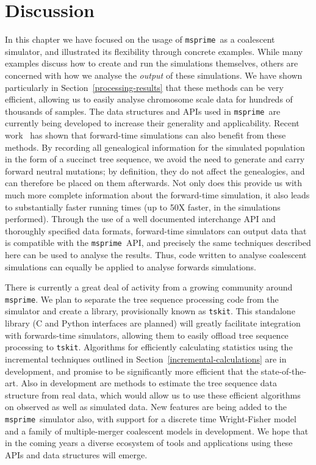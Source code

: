\documentclass[graybox]{svmult}
\newcommand{\msprime}[0]{\texttt{msprime}}
\begin{document}
\section{Discussion}
\label{sec:discussion}
In this chapter we have focused on the usage of \msprime\ as a coalescent
simulator, and illustrated its flexibility through concrete examples.
While many examples discuss how to create and run the simulations themselves, others are concerned with how we analyse the \emph{output} of
these simulations. We have shown particularly in Section~\ref{processing-results}
that these methods can be very efficient, allowing us to easily analyse
chromosome scale data for hundreds of thousands of samples.
The data structures and APIs used in \msprime\ are
currently being developed to increase their generality
and applicability. Recent work~\citep{kelleher2018efficient,haller2018tree} has shown
that forward-time simulations can also benefit from these methods. By
recording all genealogical information for the simulated population
in the form of a succinct tree sequence,
we avoid the need to generate and carry forward neutral mutations;
by definition, they do not affect the genealogies, and can therefore
be placed on them afterwards. Not only does
this provide us with much more complete information about the forward-time
simulation, it also leads to substantially faster running times
(up to 50X faster, in the simulations performed). Through the use
of a well documented interchange API and thoroughly specified
data formats, forward-time simulators can output data that
is compatible with the \msprime\ API, and precisely the same
techniques described here can be used to analyse the results.
Thus, code written to analyse coalescent simulations can equally
be applied to analyse forwards simulations.

There is currently a great deal of activity from a growing community
around \msprime. We plan to separate the tree sequence processing code
from the simulator and create a library, provisionally known
as \texttt{tskit}. This standalone library (C and Python interfaces
are planned) will greatly facilitate integration with
forwards-time simulators, allowing them to easily offload
tree sequence processing to \texttt{tskit}. Algorithms for efficiently
calculating statistics using the incremental techniques outlined
in Section~\ref{incremental-calculations} are in development, and
promise to be significantly more efficient that the state-of-the-art.
Also in development are methods to estimate the tree sequence data
structure from real data, which would allow us to use these
efficient algorithms on observed as well as simulated data. New
features are being added to the \msprime\ simulator also, with
support for a discrete time Wright-Fisher model and a family of
multiple-merger coalescent models in development. We hope that
in the coming years a diverse ecosystem of tools and applications
using these APIs and data structures will emerge.
\end{document}
